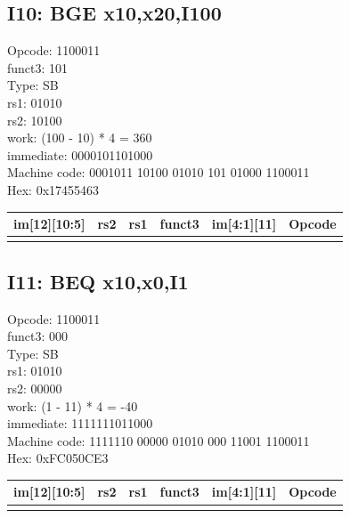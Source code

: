 \documentclass{article}
\begin{document}
\subsection*{I10:   BGE x10,x20,I100}
 
Opcode: 1100011\\
funct3: 101\\
Type: SB\\
rs1: 01010\\
rs2: 10100\\
work: (100 - 10) * 4 = 360\\
immediate: 0000101101000\\
Machine code: 0001011 10100 01010 101 01000 1100011\\
Hex: 0x17455463\\

\begin{center}
	\begin{tabularx}{1.15\textwidth} { 
		| >{\centering\arraybackslash}X 
		| >{\centering\arraybackslash}X 
		| >{\centering\arraybackslash}X 
		| >{\centering\arraybackslash}X
        | >{\centering\arraybackslash}X
		| >{\centering\arraybackslash}X | }
	   \hline
	   	im[12][10:5] & rs2 & rs1 & funct3 & im[4:1][11] & Opcode \\
	   \hline
	   0001011  & 10100  & 01010 & 101 & 01000 & 1100011 \\
	  \hline
	\end{tabularx}
\end{center}

\subsection*{I11:   BEQ x10,x0,I1}

Opcode: 1100011\\
funct3: 000\\
Type: SB\\
rs1: 01010\\
rs2: 00000\\
work: (1 - 11) * 4 = -40\\
immediate: 1111111011000\\
Machine code: 1111110 00000 01010 000 11001 1100011\\
Hex: 0xFC050CE3\\

\begin{center}
    \begin{tabularx}{1.15\textwidth} { 
        | >{\centering\arraybackslash}X 
        | >{\centering\arraybackslash}X 
        | >{\centering\arraybackslash}X 
        | >{\centering\arraybackslash}X
        | >{\centering\arraybackslash}X
        | >{\centering\arraybackslash}X | }
       \hline
       	im[12][10:5] & rs2 & rs1 & funct3 & im[4:1][11] & Opcode \\
       \hline
       1111110  & 00000  & 01010 & 000 & 11001 & 1100011 \\
      \hline
    \end{tabularx}
\end{center}
\end{document}
